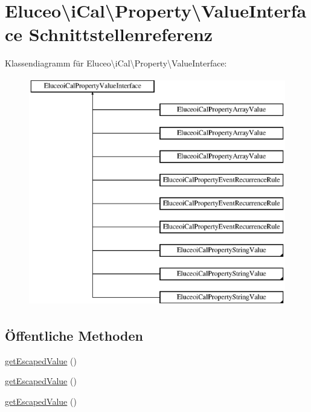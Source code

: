 \hypertarget{interface_eluceo_1_1i_cal_1_1_property_1_1_value_interface}{}\section{Eluceo\textbackslash{}i\+Cal\textbackslash{}Property\textbackslash{}Value\+Interface Schnittstellenreferenz}
\label{interface_eluceo_1_1i_cal_1_1_property_1_1_value_interface}
Klassendiagramm für Eluceo\textbackslash{}i\+Cal\textbackslash{}Property\textbackslash{}Value\+Interface\+:\begin{figure}[H]
\begin{center}
\leavevmode
\includegraphics[height=10.000000cm]{interface_eluceo_1_1i_cal_1_1_property_1_1_value_interface}
\end{center}
\end{figure}
\subsection*{Öffentliche Methoden}
\begin{DoxyCompactItemize}
\item 
\mbox{\hyperlink{interface_eluceo_1_1i_cal_1_1_property_1_1_value_interface_a408412ae5d11fd3f239c7985aede8c32}{get\+Escaped\+Value}} ()
\item 
\mbox{\hyperlink{interface_eluceo_1_1i_cal_1_1_property_1_1_value_interface_a408412ae5d11fd3f239c7985aede8c32}{get\+Escaped\+Value}} ()
\item 
\mbox{\hyperlink{interface_eluceo_1_1i_cal_1_1_property_1_1_value_interface_a408412ae5d11fd3f239c7985aede8c32}{get\+Escaped\+Value}} ()
\end{DoxyCompactItemize}


